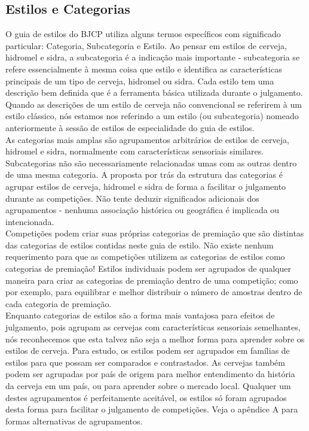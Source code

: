 \subsection*{Estilos e Categorias}
O guia de estilos do BJCP utiliza alguns termos específicos com significado particular: Categoria, Subcategoria e Estilo. Ao pensar em estilos de cerveja, hidromel e sidra, a subcategoria é a indicação mais importante - subcategoria se refere essencialmente à mesma coisa que estilo e identifica as características principais de um tipo de cerveja, hidromel ou sidra. Cada estilo tem uma descrição bem definida que é a ferramenta básica utilizada durante o julgamento. \\
Quando as descrições de um estilo de cerveja não convencional se referirem à um estilo clássico, nós estamos nos referindo a um estilo (ou subcategoria) nomeado anteriormente à sessão de estilos de especialidade do guia de estilos.\\
As categorias mais amplas são agrupamentos arbitrários de estilos de cerveja, hidromel e sidra, normalmente com características sensoriais similares. Subcategorias não são necessariamente relacionadas umas com as outras dentro de uma mesma categoria. A proposta por trás da estrutura das categorias é agrupar estilos de cerveja, hidromel e sidra de forma a facilitar o julgamento durante as competições. Não tente deduzir significados adicionais dos agrupamentos - nenhuma associação histórica ou geográfica é implicada ou intencionada.\\
Competições podem criar suas próprias categorias de premiação que são distintas das categorias de estilos contidas neste guia de estilo. Não existe nenhum requerimento para que as competições utilizem as categorias de estilos como categorias de premiação! Estilos individuais podem ser agrupados de qualquer maneira para criar as categorias de premiação dentro de uma competição; como por exemplo, para equilibrar e melhor distribuir o número de amostras dentro de cada categoria de premiação.\\
Enquanto categorias de estilos são a forma mais vantajosa para efeitos de julgamento, pois agrupam as cervejas com características sensoriais semelhantes, nós reconhecemos que esta talvez não seja a melhor forma para aprender sobre os estilos de cerveja. Para estudo, os estilos podem ser agrupados em famílias de estilos para que possam ser comparados e contrastados. As cervejas também podem ser agrupadas por país de origem para melhor entendimento da história da cerveja em um país, ou para aprender sobre o mercado local. Qualquer um destes agrupamentos é perfeitamente aceitável, os estilos só foram agrupados desta forma para facilitar o julgamento de competições. Veja o apêndice A para formas alternativas de agrupamentos.